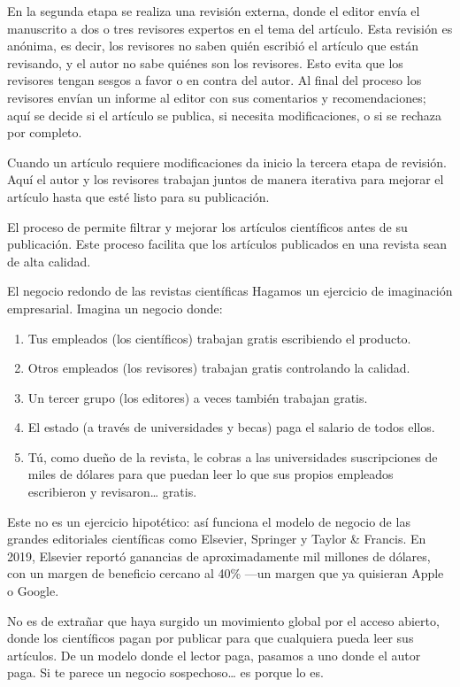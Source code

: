 En la segunda etapa se realiza una revisión externa, donde el editor envía el manuscrito a dos o tres revisores expertos en el tema del artículo.
Esta revisión es anónima, es decir, los revisores no saben quién escribió el artículo que están revisando, y el autor no sabe quiénes son los revisores.
Esto evita que los revisores tengan sesgos a favor o en contra del autor.
Al final del proceso los revisores envían un informe al editor con sus comentarios y recomendaciones; aquí se decide si el artículo se publica, si necesita modificaciones, o si se rechaza por completo.

Cuando un artículo requiere modificaciones da inicio la tercera etapa de revisión.
Aquí el autor y los revisores trabajan juntos de manera iterativa para mejorar el artículo hasta que esté listo para su publicación.

\begin{remember}
	El proceso de  permite filtrar y mejorar los
	artículos científicos antes de su publicación.
	Este proceso facilita que los artículos publicados en una revista sean de
	alta calidad.
\end{remember}

\begin{digress}{El negocio redondo de las revistas científicas}
	Hagamos un ejercicio de imaginación empresarial.
	Imagina un negocio donde:
	\begin{enumerate}
		\item Tus empleados (los científicos) trabajan gratis escribiendo el producto.
		\item Otros empleados (los revisores) trabajan gratis controlando la calidad.
		\item Un tercer grupo (los editores) a veces también trabajan gratis.
		\item El estado (a través de universidades y becas) paga el salario de todos ellos.
		\item Tú, como dueño de la revista, le cobras a las universidades suscripciones de miles de dólares para que puedan leer lo que sus propios empleados escribieron y revisaron… gratis.
	\end{enumerate}
	Este no es un ejercicio hipotético: así funciona el modelo de negocio de las grandes editoriales científicas como Elsevier, Springer y Taylor \& Francis.
	En 2019, Elsevier reportó ganancias de aproximadamente mil millones de dólares, con un margen de beneficio cercano al 40\% —un margen que ya quisieran Apple o Google.

	No es de extrañar que haya surgido un movimiento global por el acceso abierto, donde los científicos pagan por publicar para que cualquiera pueda leer sus artículos.
	De un modelo donde el lector paga, pasamos a uno donde el autor paga.
	Si te parece un negocio sospechoso… es porque lo es.
\end{digress}

